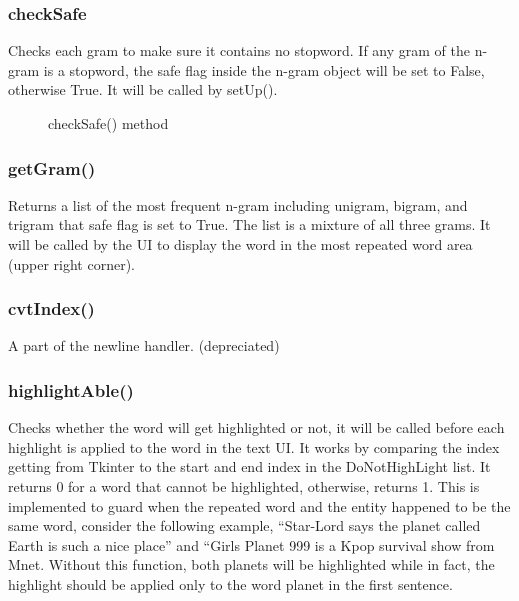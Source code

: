 \documentclass[12pt,oneside,openright,a4paper]{cpe-english-project}
\begin{document}
\subsubsection{checkSafe}
Checks each gram to make sure it contains no stopword. If any gram of the n-gram is a stopword, the safe flag inside the n-gram object will be set to False, otherwise True. It will be called by setUp().
\begin{figure}[!h]\centering
\setlength{\fboxrule}{0.2mm} %
\setlength{\fboxsep}{1cm}
\caption{checkSafe() method}\label{fig:checkSafe() method}
\end{figure}
\subsubsection{getGram()}
Returns a list of the most frequent n-gram including unigram, bigram, and trigram that safe flag is set to True. The list is a mixture of all three grams. It will be called by the UI to display the word in the most repeated word area (upper right corner). 
\subsubsection{cvtIndex()}
A part of the newline handler. (depreciated)

\subsubsection{highlightAble() }
Checks whether the word will get highlighted or not, it will be called before each highlight is applied to the word in the text UI. It works by comparing the index getting from Tkinter to the start and end index in the DoNotHighLight list. It returns 0 for a word that cannot be highlighted, otherwise, returns 1. This is implemented to guard when the repeated word and the entity happened to be the same word, consider the following example, “Star-Lord says the planet called Earth is such a nice place” and “Girls Planet 999 is a Kpop survival show from Mnet. Without this function, both planets will be highlighted while in fact, the highlight should be applied only to the word planet in the first sentence.
\end{document}
